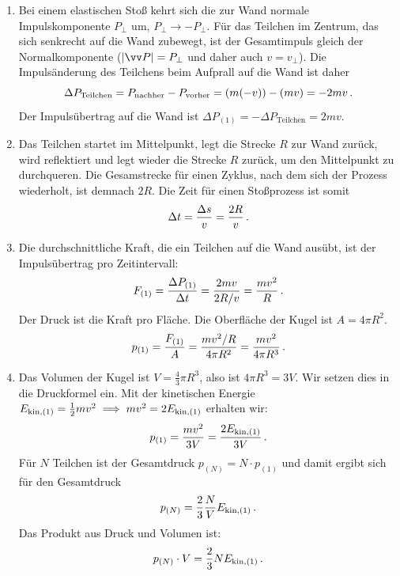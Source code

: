 \documentclass[ngerman]{scrreprt}
\newenvironment{loesungbox}[1]
  {\needspace{5\baselineskip}\begin{loesungboxstyle}[frametitle={#1}]}
  {\end{loesungboxstyle}}
\begin{document}
\begin{loesungbox}{Lösung zu \Cref{aufg:druck_kraftuebertragung}}
\begin{enumerate}
    \item Bei einem elastischen Stoß kehrt sich die zur Wand normale Impulskomponente $P_\perp$ um, \gDh $P_\perp \rightarrow -P_\perp$. Für das Teilchen im Zentrum, das sich senkrecht auf die Wand zubewegt, ist der Gesamtimpuls gleich der Normalkomponente ($|\ivec{P}| = P_\perp$ und daher auch $v = v_\perp$). Die Impulsänderung des Teilchens beim Aufprall auf die Wand ist daher     \begin{equation}
        \Delta P_{\text{Teilchen}} = P_{\text{nachher}} - P_{\text{vorher}} = (m(-v)) - (mv) = -2mv \,.
    \end{equation}
    Der Impulsübertrag auf die Wand ist $\Delta P_{(1)} = - \Delta P_\text{Teilchen} = 2mv$.
    \item Das Teilchen startet im Mittelpunkt, legt die Strecke $R$ zur Wand zurück, wird reflektiert und legt wieder die Strecke $R$ zurück, um den Mittelpunkt zu durchqueren. Die Gesamstrecke für einen Zyklus, nach dem sich der Prozess wiederholt, ist demnach $2R$. Die Zeit für einen Stoßprozess ist somit
    \begin{equation}
        \Delta t = \frac{\Delta s}{v} = \frac{2R}{v} \,.
    \end{equation}
    \item Die durchschnittliche Kraft, die ein Teilchen auf die Wand ausübt, ist der Impulsübertrag pro Zeitintervall:
    \begin{equation}
        F_{(1)} = \frac{\Delta P_{(1)}}{\Delta t} = \frac{2mv}{2R/v} = \frac{mv^2}{R} \,.
    \end{equation}
    Der Druck ist die Kraft pro Fläche. Die Oberfläche der Kugel ist $A=4\pi R^2$.
    \begin{equation}
        p_{(1)} = \frac{F_{(1)}}{A} = \frac{mv^2/R}{4\pi R^2} = \frac{mv^2}{4\pi R^3} \,.
    \end{equation}
    
    \item Das Volumen der Kugel ist $V = \frac{4}{3}\pi R^3$, also ist $4\pi R^3 = 3V$. Wir setzen dies in die Druckformel ein. Mit der kinetischen Energie $E_{\mathrm{kin},(1)} = \frac{1}{2}mv^2 \implies mv^2 = 2E_{\mathrm{kin},(1)}$ erhalten wir:
    \begin{equation}
        p_{(1)} = \frac{mv^2}{3V} = \frac{2E_{\mathrm{kin},(1)}}{3V} \,.
    \end{equation}
    Für $N$ Teilchen ist der Gesamtdruck $p_{(N)} = N \cdot p_{(1)}$ und damit ergibt sich für den Gesamtdruck
    \begin{equation}\label{eq: druck_N_teilchen}
        p_{(N)} = \frac{2}{3}\frac{N}{V}E_{\mathrm{kin},(1)} \,.
    \end{equation}
    Das Produkt aus Druck und Volumen ist:
    \begin{equation}\label{eq: druck_volumen_produkt}
        p_{(N)} \cdot V = \frac{2}{3} N E_{\mathrm{kin},(1)} \,.
    \end{equation}
    

\end{enumerate}
\end{loesungbox}
\end{document}
